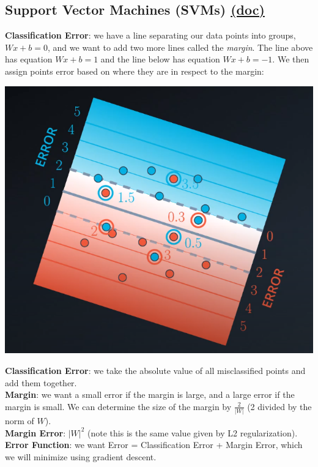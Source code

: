 \documentclass[11pt, a4paper]{article}
\begin{document}
\begin{spacing}{1.1}
	\subsection{Support Vector Machines (SVMs) \href{https://scikit-learn.org/stable/modules/generated/sklearn.svm.SVC.html}{(doc)}}
	\textbf{Classification Error}: we have a line separating our data points into groups, $Wx+b = 0$, and we want to add two more lines called the \textit{margin}. The line above has equation $Wx+b = 1$ and the line below has equation $Wx+b = -1$. We then assign points error based on where they are in respect to the margin:
	\begin{center}
	\includegraphics[scale=.3]{SVM}
	\end{center}
	\textbf{Classification Error}: we take the absolute value of all misclassified points and add them together. \vspace*{2mm}\\
	\textbf{Margin}: we want a small error if the margin is large, and a large error if the margin is small. We can determine the size of the margin by $\frac{2}{|W|}$ (2 divided by the norm of $W$). \vspace*{2mm}\\
	\textbf{Margin Error}: $|W|^2$ (note this is the same value given by L2 regularization). \vspace*{2mm}\\
	\textbf{Error Function}: we want Error = Classification Error + Margin Error, which we will minimize using gradient descent. \vspace*{2mm}\\

\end{spacing}
\end{document}
